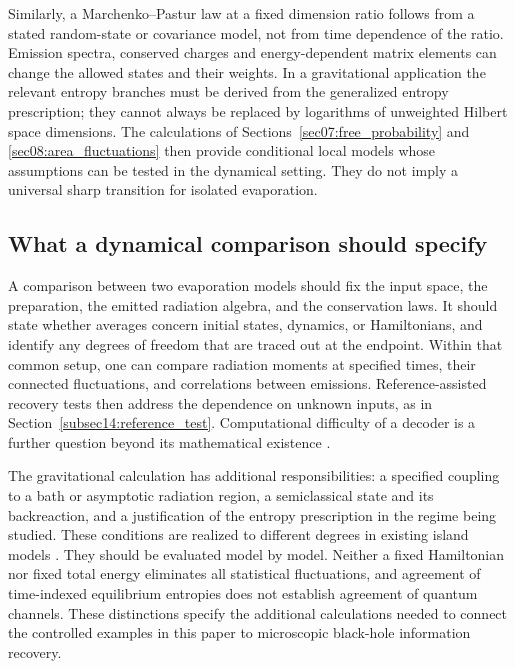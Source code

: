 \documentclass[11pt,letterpaper]{article}
\theoremstyle{plain}
\theoremstyle{definition}
\theoremstyle{remark}
\begin{document}
Similarly, a Marchenko--Pastur law at a fixed dimension ratio follows
from a stated random-state or covariance model, not from time
dependence of the ratio. Emission spectra, conserved charges and
energy-dependent matrix elements can change the allowed states and
their weights. In a gravitational application the relevant entropy
branches must be derived from the generalized entropy prescription;
they cannot always be replaced by logarithms of unweighted Hilbert
space dimensions. The calculations of
Sections~\ref{sec07:free_probability} and
\ref{sec08:area_fluctuations} then provide conditional local models
whose assumptions can be tested in the dynamical setting. They do
not imply a universal sharp transition for isolated evaporation.

\subsection{What a dynamical comparison should specify}
\label{subsec14:dynamical_target}

A comparison between two evaporation models should fix the input
space, the preparation, the emitted radiation algebra, and the
conservation laws. It should state whether averages concern initial
states, dynamics, or Hamiltonians, and identify any degrees of freedom
that are traced out at the endpoint. Within that common setup, one
can compare radiation moments at specified times, their connected
fluctuations, and correlations between emissions. Reference-assisted
recovery tests then address the dependence on unknown inputs, as in
Section~\ref{subsec14:reference_test}. Computational difficulty of a
decoder is a further question beyond its mathematical existence
\citep{haydenpreskill2007}.

The gravitational calculation has additional responsibilities: a
specified coupling to a bath or asymptotic radiation region, a
semiclassical state and its backreaction, and a justification of the
entropy prescription in the regime being studied. These conditions
are realized to different degrees in existing island models
\citep{almheirietal2019,almheirietal2020islands}.
They should be evaluated model by model. Neither a fixed Hamiltonian
nor fixed total energy eliminates all statistical fluctuations, and
agreement of time-indexed equilibrium entropies does not establish
agreement of quantum channels. These distinctions specify the
additional calculations needed to connect the controlled examples in
this paper to microscopic black-hole information recovery.
\end{document}
